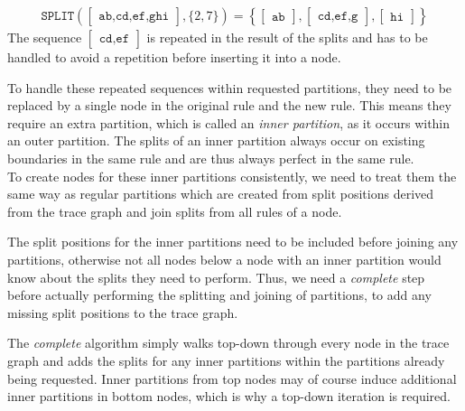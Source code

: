 %
\begin{align*}
    \texttt{SPLIT}(
\begin{bmatrix}
    \texttt{ab,cd,ef,ghi}
\end{bmatrix}
, \{2, 7\}) = \left\{
\begin{bmatrix}
    \texttt{ab}
\end{bmatrix}
,
\begin{bmatrix}
    \texttt{cd,ef,g}
\end{bmatrix},
\begin{bmatrix}
    \texttt{hi}
\end{bmatrix}
\right\}
\end{align*}
%
The sequence $\begin{bmatrix}\texttt{cd,ef}\end{bmatrix}$ is repeated in the result of the splits and has to be handled to avoid a repetition before inserting it into a node.

To handle these repeated sequences within requested partitions, they need to be replaced by a single node in the original rule and the new rule. This means they require an extra partition, which is called an \textit{inner partition}, as it occurs within an outer partition. The splits of an inner partition always occur on existing boundaries in the same rule and are thus always perfect in the same rule.\\
To create nodes for these inner partitions consistently, we need to treat them the same way as regular partitions which are created from split positions derived from the trace graph and join splits from all rules of a node.

\noindent
The split positions for the inner partitions need to be included before joining any partitions, otherwise not all nodes below a node with an inner partition would know about the splits they need to perform. Thus, we need a \emph{complete} step before actually performing the splitting and joining of partitions, to add any missing split positions to the trace graph.

\noindent
The \emph{complete} algorithm simply walks top-down through every node in the trace graph and adds the splits for any inner partitions within the partitions already being requested. Inner partitions from top nodes may of course induce additional inner partitions in bottom nodes, which is why a top-down iteration is required.



